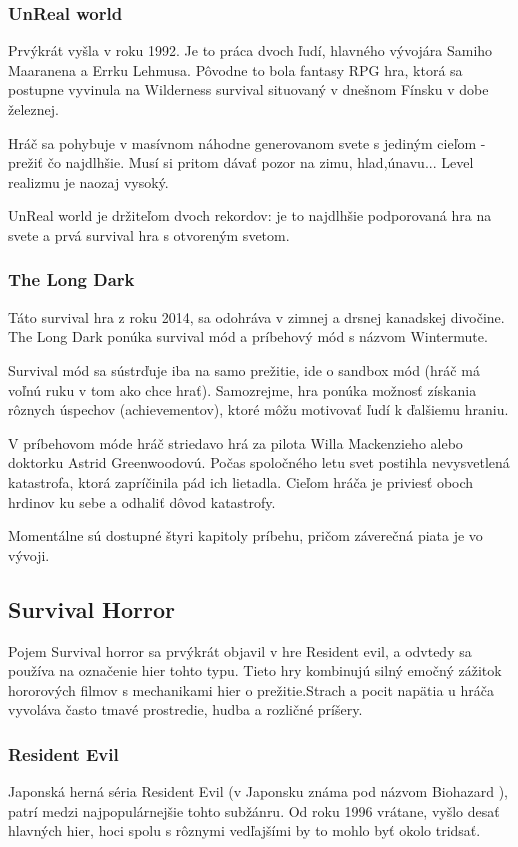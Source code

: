 \documentclass[10pt,oneoside,slovak,a4paper]{article}
\begin{document}
\subsubsection{UnReal world}
Prvýkrát vyšla v roku 1992. Je to práca dvoch ľudí, hlavného vývojára Samiho Maaranena a Errku Lehmusa. Pôvodne to bola fantasy RPG hra, ktorá sa postupne vyvinula na Wilderness survival situovaný v dnešnom Fínsku v dobe železnej. 

Hráč sa pohybuje v masívnom náhodne generovanom svete s jediným cieľom - prežiť čo najdlhšie. Musí si pritom dávať pozor na zimu, hlad,únavu... Level realizmu je naozaj vysoký.

UnReal world je držiteľom dvoch rekordov: je to najdlhšie podporovaná hra na svete a prvá survival hra s otvoreným svetom. \cite{UnRealWorld}

\subsubsection{The Long Dark}

Táto survival hra z roku 2014, sa odohráva v zimnej a drsnej kanadskej divočine. The Long Dark ponúka survival mód a príbehový mód s názvom Wintermute.

Survival mód sa  sústrďuje iba na samo prežitie, ide o sandbox  mód (hráč má voľnú ruku v tom ako chce hrať).  Samozrejme, hra ponúka  možnosť získania rôznych úspechov (achievementov), ktoré môžu motivovať ľudí k ďalšiemu hraniu. \cite{Virtanen}

V príbehovom móde hráč striedavo hrá za pilota Willa Mackenzieho  alebo doktorku  Astrid Greenwoodovú. Počas spoločného letu svet postihla nevysvetlená katastrofa, ktorá zapríčinila pád ich lietadla. Cieľom hráča je priviesť oboch hrdinov ku sebe a odhaliť dôvod katastrofy. \cite{Virtanen}

Momentálne sú dostupné štyri kapitoly príbehu, pričom záverečná piata je vo vývoji.


\subsection{Survival Horror}
Pojem Survival horror sa prvýkrát objavil v hre Resident evil, a odvtedy sa používa na označenie hier tohto typu. \cite{Kirkland} Tieto hry kombinujú silný emočný zážitok hororových filmov s mechanikami hier o prežitie.Strach a pocit napätia u hráča vyvoláva často  tmavé prostredie, hudba a rozličné príšery.

\subsubsection{Resident Evil}
Japonská herná séria Resident Evil (v Japonsku známa pod názvom Biohazard \cite{Capcom}), patrí medzi najpopulárnejšie tohto subžánru. Od roku 1996 vrátane, vyšlo desať hlavných hier, hoci spolu s rôznymi vedľajšími by to mohlo byť okolo tridsať.  \cite{ResEv}
\end{document}
